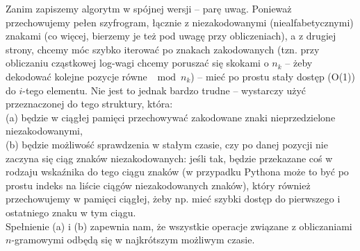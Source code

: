 \documentclass[a4paper]{article}
\theoremstyle{defn}
\theoremstyle{theorem}
\theoremstyle{lemma}
\theoremstyle{cor}
\theoremstyle{fact}
\begin{document}
Zanim zapiszemy algorytm w spójnej wersji – parę uwag. Ponieważ przechowujemy pełen szyfrogram, łącznie z niezakodowanymi (niealfabetycznymi) znakami (co więcej, bierzemy je też pod uwagę przy obliczeniach), a z drugiej strony, chcemy móc szybko iterować po znakach zakodowanych (tzn. przy obliczaniu cząstkowej log-wagi chcemy poruszać się skokami o $n_k$ – żeby dekodować kolejne pozycje równe $\mod n_k$) – mieć po prostu stały dostęp (O(1)) do $i$-tego elementu. Nie jest to jednak bardzo trudne – wystarczy użyć przeznaczonej do tego struktury, która:\\
(a) będzie w ciągłej pamięci przechowywać zakodowane znaki nieprzedzielone niezakodowanymi,\\
(b) będzie możliwość sprawdzenia w stałym czasie, czy po danej pozycji nie zaczyna się ciąg znaków niezakodowanych: jeśli tak, będzie przekazane coś w rodzaju wskaźnika do tego ciągu znaków (w przypadku Pythona może to być po prostu indeks na liście ciągów niezakodowanych znaków), który również przechowujemy w pamięci ciągłej, żeby np. mieć szybki dostęp do pierwszego i ostatniego znaku w tym ciągu.\\

Spełnienie (a) i (b) zapewnia nam, że wszystkie operacje związane z obliczaniami $n$-gramowymi odbędą się w najkrótszym możliwym czasie.\\
\end{document}
